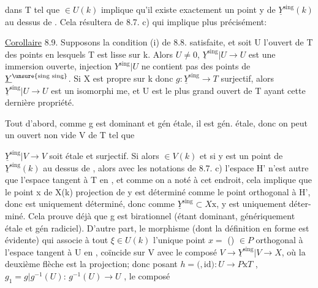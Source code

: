 
dans T tel que \hand{$\xi$} $\in U(k)$  implique qu'il existe exactement  un point  y de
$\underline{Y}^{\text{sing}}(k)$ au dessus de \hand{$\xi$}. Cela résultera de 8.7. c) qui implique plus
 précisément:

\uline{Corollaire} 8.9.  Supposons la condition (i) de 8.8. satisfaite, et
soit  
U l'ouvert de T des points en lesquels T est lisse sur k. Alors $U\neq 0$, 
$\underline{Y}^{\text{sing}}|U \longrightarrow U$ est une immersion ouverte,  injection $Y^{\text{sing}}|U$ ne contient pas des points de $\underline{Y}^{\unsure{\text{sing sing}}}$.
 Si X est propre sur
k donc $g:\underline{Y}^{\text{sing}}\longrightarrow T$ surjectif, alors $\underline{Y}^{\text{sing}}|U\longrightarrow U$ est un isomorphi
me, et U est le plus grand ouvert de T ayant cette dernière propriété.

Tout d'abord, comme g est dominant et gén  étale, il est
gén. étale, donc on peut  un ouvert non vide V de T tel que

$\underline{Y}^{\text{sing}}|V \longrightarrow V$ soit étale et surjectif. Si alors \hand{$\xi$}$\in V(k)$ et si y est
un point de $\underline{Y}^{\text{sing}}(k)$ au dessus de \hand{$\xi$}, alors avec les notations de
8.7. c)  l'espace H' n'est autre que l'espace tangent à T en \hand{$\xi$},
et comme on a noté à cet endroit, cela implique que le point x de X(k)
projection de y est déterminé comme le point orthogonal à H', donc est
uniquement déterminé, donc comme $\underline{Y}^{\text{sing}}\subset X\text{x}$, y est uniquement déter-%
miné. Cela prouve déjà que g est birationnel (étant dominant, 
génériquement  étale et gén radiciel). 
D'autre part, le morphisme \hand{$\unsure{\nu|\gamma}$}(dont la définition en forme est évidente)
qui associe à tout $\xi$$\in U(k)$ l'unique point $x=$ \hand{$\nu$}(\hand{$\xi$}) $\in P$ orthogonal à
l'espace tangent à U en \hand{$\xi$}, coïncide sur V avec le composé
$V\rightarrow \underline{Y}^{\text{sing}}|V \longrightarrow X$, où la deuxième flèche est la projection; donc
posant  $h=($\hand{$\nu$}$,\mathrm{id}) : U\rightarrow P\text{x}T$ , 
 $g_1 = g|g^{-1}(U)$: $g^{-1}(U)\rightarrow U$ , le composé


